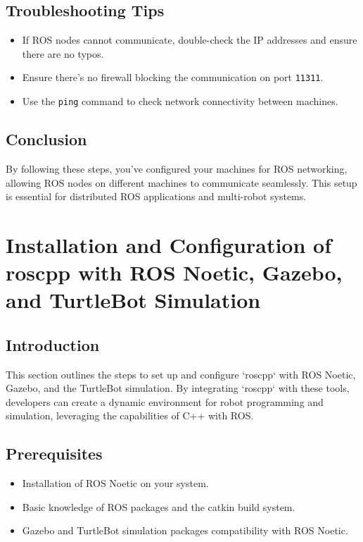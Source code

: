 \documentclass[12pt,a4paper]{article}
\begin{document}
	\subsection{Troubleshooting Tips}
	\begin{itemize}
		\item If ROS nodes cannot communicate, double-check the IP addresses and ensure there are no typos.
		\item Ensure there's no firewall blocking the communication on port \texttt{11311}.
		\item Use the \texttt{ping} command to check network connectivity between machines.
	\end{itemize}
	
	\subsection{Conclusion}
	By following these steps, you've configured your machines for ROS networking, allowing ROS nodes on different machines to communicate seamlessly. This setup is essential for distributed ROS applications and multi-robot systems.
	\clearpage
	\section{Installation and Configuration of roscpp with ROS Noetic, Gazebo, and TurtleBot Simulation}
	
	\subsection{Introduction}
	This section outlines the steps to set up and configure `roscpp` with ROS Noetic, Gazebo, and the TurtleBot simulation. By integrating `roscpp` with these tools, developers can create a dynamic environment for robot programming and simulation, leveraging the capabilities of C++ with ROS.
	
	\subsection{Prerequisites}
	\begin{itemize}
		\item Installation of ROS Noetic on your system.
		\item Basic knowledge of ROS packages and the catkin build system.
		\item Gazebo and TurtleBot simulation packages compatibility with ROS Noetic.
	\end{itemize}
	
\end{document}
